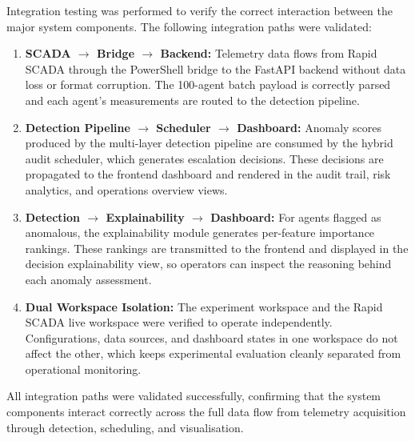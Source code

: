 Integration testing was performed to verify the correct interaction between the major system components. The following integration paths were validated:

\begin{enumerate}
    \item \textbf{SCADA $\rightarrow$ Bridge $\rightarrow$ Backend:} Telemetry data flows from Rapid SCADA through the PowerShell bridge to the FastAPI backend without data loss or format corruption. The 100-agent batch payload is correctly parsed and each agent's measurements are routed to the detection pipeline.

    \item \textbf{Detection Pipeline $\rightarrow$ Scheduler $\rightarrow$ Dashboard:} Anomaly scores produced by the multi-layer detection pipeline are consumed by the hybrid audit scheduler, which generates escalation decisions. These decisions are propagated to the frontend dashboard and rendered in the audit trail, risk analytics, and operations overview views.

    \item \textbf{Detection $\rightarrow$ Explainability $\rightarrow$ Dashboard:} For agents flagged as anomalous, the explainability module generates per-feature importance rankings. These rankings are transmitted to the frontend and displayed in the decision explainability view, so operators can inspect the reasoning behind each anomaly assessment.

    \item \textbf{Dual Workspace Isolation:} The experiment workspace and the Rapid SCADA live workspace were verified to operate independently. Configurations, data sources, and dashboard states in one workspace do not affect the other, which keeps experimental evaluation cleanly separated from operational monitoring.
\end{enumerate}

\par \vspace{0.35cm}

\noindent
All integration paths were validated successfully, confirming that the system components interact correctly across the full data flow from telemetry acquisition through detection, scheduling, and visualisation.
